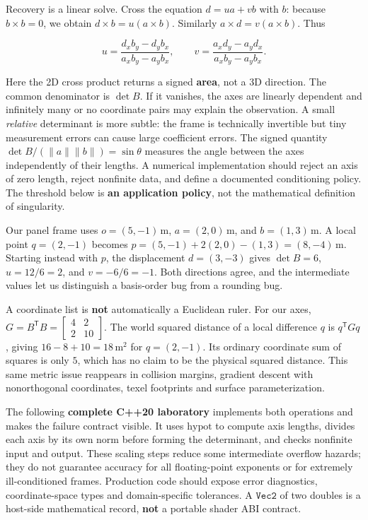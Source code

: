 Recovery is a linear solve. Cross the equation \(d=ua+vb\) with \(b\): because \(b\times b=0\), we obtain \(d\times b=u(a\times b)\). Similarly \(a\times d=v(a\times b)\). Thus

\[
u=\frac{d_xb_y-d_yb_x}{a_xb_y-a_yb_x},
\qquad
v=\frac{a_xd_y-a_yd_x}{a_xb_y-a_yb_x}.
\]

Here the 2D cross product returns a signed \textbf{area}, not a 3D direction. The common denominator is \(\det B\). If it vanishes, the axes are linearly dependent and infinitely many or no coordinate pairs may explain the observation. A small \emph{relative} determinant is more subtle: the frame is technically invertible but tiny measurement errors can cause large coefficient errors. The signed quantity \(\det B/(\|a\|\|b\|)=\sin\theta\) measures the angle between the axes independently of their lengths. A numerical implementation should reject an axis of zero length, reject nonfinite data, and define a documented conditioning policy. The threshold below is \textbf{an application policy}, not the mathematical definition of singularity.

Our panel frame uses \(o=(5,-1)\,\mathrm m\), \(a=(2,0)\,\mathrm m\), and \(b=(1,3)\,\mathrm m\). A local point \(q=(2,-1)\) becomes \(p=(5,-1)+2(2,0)-(1,3)=(8,-4)\,\mathrm m\). Starting instead with \(p\), the displacement \(d=(3,-3)\) gives \(\det B=6\), \(u=12/6=2\), and \(v=-6/6=-1\). Both directions agree, and the intermediate values let us distinguish a basis-order bug from a rounding bug.

A coordinate list is \textbf{not} automatically a Euclidean ruler. For our axes, \(G=B^\mathsf{T}B=\left[\begin{smallmatrix}4&2\\2&10\end{smallmatrix}\right]\). The world squared distance of a local difference \(q\) is \(q^\mathsf{T}Gq\), giving \(16-8+10=18\,\mathrm m^2\) for \(q=(2,-1)\). Its ordinary coordinate sum of squares is only \(5\), which has no claim to be the physical squared distance. This same metric issue reappears in collision margins, gradient descent with nonorthogonal coordinates, texel footprints and surface parameterization.

The following \textbf{complete C++20 laboratory} implements both operations and makes the failure contract visible. It uses \(\mathrm{hypot}\) to compute axis lengths, divides each axis by its own norm before forming the determinant, and checks nonfinite input and output. These scaling steps reduce some intermediate overflow hazards; they do not guarantee accuracy for all floating-point exponents or for extremely ill-conditioned frames. Production code should expose error diagnostics, coordinate-space types and domain-specific tolerances. A \(\texttt{Vec2}\) of two doubles is a host-side mathematical record, \textbf{not} a portable shader ABI contract.

